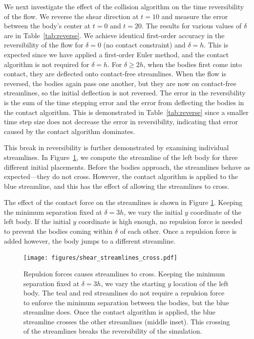 \documentclass[preprint, 10pt]{elsarticle}
\begin{document}
We next investigate the effect of the collision algorithm on the time
reversibility of the flow. We reverse the shear direction at $t=10$ and
measure the error between the body's center at $t=0$ and $t=20$.
The results for various values of $\delta$ are in
Table~\ref{tab:reverse}. We achieve identical first-order accuracy in
the reversibility of the flow for $\delta = 0$ (no contact constraint)
and $\delta=h$.  This is expected since we have applied a first-order
Euler method, and the contact algorithm is not required for $\delta =
h$.  For $\delta \geq 2h$, when the bodies first come into contact,
they are deflected onto contact-free streamlines.  When the flow is
reversed, the bodies again pass one another, but they are now on
contact-free streamlines, so the initial deflection is not reversed.
The error in the reversibility is the sum of the time stepping error and
the error from deflecting the bodies in the contact algorithm.  This is
demonstrated in Table~\ref{tab:reverse} since a smaller time step size
does not decrease the error in reversibility, indicating that error
caused by the contact algorithm dominates.

This break in reversibility is further demonstrated by examining
individual streamlines.  In Figure~\ref{fig:shear_cross}, we compute the
streamline of the left body for three different initial placements.
Before the bodies approach, the streamlines behave as expected---they
do not cross.  However, the contact algorithm is applied to the blue
streamline, and this has the effect of allowing the streamlines to
cross.

The effect of the contact force on the streamlines is shown in Figure
\ref{fig:shear_cross}. Keeping the minimum separation fixed at $\delta =
3h$, we vary the initial $y$ coordinate of the left body.  If the
initial $y$ coordinate is high enough, no repulsion force is needed to
prevent the bodies coming within $\delta$ of each other. Once a
repulsion force is added however, the body jumps to a different
streamline.

\begin{figure}[!h]
\begin{center}
\texttt{[image: figures/shear\_streamlines\_cross.pdf]}
\end{center}
\caption{Repulsion forces causes streamlines to cross. Keeping the
minimum separation fixed at $\delta=3h$, we vary the starting $y$
location of the left body. The teal and red streamlines do not
require a repulsion force to enforce the minimum separation between the
bodies, but the blue streamline does. Once the contact algorithm is
applied, the blue streamline crosses the other streamlines (middle
inset). This crossing of the streamlines breaks the reversibility of the
simulation.}\label{fig:shear_cross}
\end{figure}
\end{document}
